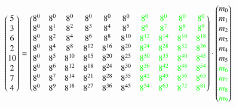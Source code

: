 \[
\begin{pmatrix}
	5 \\ 3 \\ 6 \\ 2 \\ 10 \\ 2 \\ 7 \\ 4 \\
\end{pmatrix}
=
\begin{pmatrix}
	8^0&    8^0&    8^0&    8^0&    8^0&    8^0&    \textcolor{green}{8^0}&    \textcolor{green}{8^0}&    \textcolor{green}{8^0}&    \textcolor{green}{8^0}\\
	8^0&	8^1&	8^2&	8^3&	8^4&	8^5&	\textcolor{green}{8^6}&	   \textcolor{green}{8^7}&    \textcolor{green}{8^8}&    \textcolor{green}{8^9}\\
	8^0&	8^2&	8^4&	8^6&	8^8& 8^{10}& \textcolor{green}{8^{12}}& \textcolor{green}{8^{14}}& \textcolor{green}{8^{16}}& \textcolor{green}{8^{18}}\\
	8^0&	8^4&	8^8& 8^{12}& 8^{16}& 8^{20}& \textcolor{green}{8^{24}}& \textcolor{green}{8^{28}}& \textcolor{green}{8^{32}}& \textcolor{green}{8^{36}}\\
	8^0&	8^5& 8^{10}& 8^{15}& 8^{20}& 8^{25}& \textcolor{green}{8^{30}}& \textcolor{green}{8^{35}}& \textcolor{green}{8^{40}}& \textcolor{green}{8^{45}}\\
	8^0&	8^6& 8^{12}& 8^{18}& 8^{24}& 8^{30}& \textcolor{green}{8^{36}}& \textcolor{green}{8^{42}}& \textcolor{green}{8^{48}}& \textcolor{green}{8^{54}}\\
	8^0&	8^7& 8^{14}& 8^{21}& 8^{28}& 8^{35}& \textcolor{green}{8^{42}}& \textcolor{green}{8^{49}}& \textcolor{green}{8^{56}}& \textcolor{green}{8^{63}}\\
	8^0&	8^9& 8^{18}& 8^{27}& 8^{36}& 8^{45}& \textcolor{green}{8^{54}}& \textcolor{green}{8^{63}}& \textcolor{green}{8^{72}}& \textcolor{green}{8^{81}}\\
\end{pmatrix}
\cdot
\begin{pmatrix}
	m_0 \\ m_1 \\ m_2 \\ m_3 \\ m_4 \\ m_5 \\ \textcolor{green}{m_6} \\ \textcolor{green}{m_7} \\ \textcolor{green}{m_8} \\ \textcolor{green}{m_9} \\
\end{pmatrix}
\]
